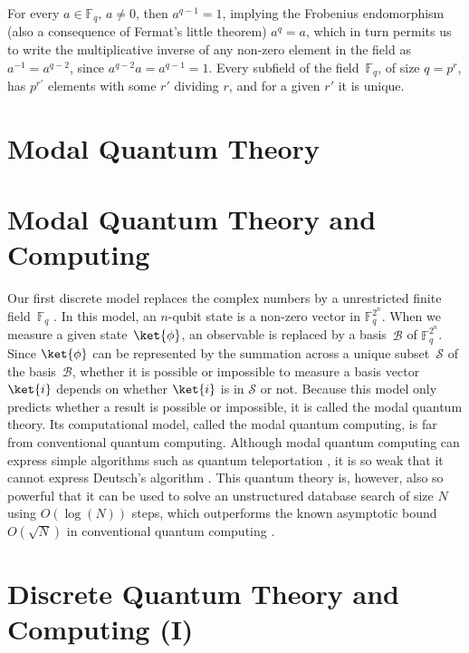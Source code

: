 \documentclass[twoside]{iuphd}
\newcommand{\Fq}{\mathbb{F}_{q}}
\begin{document}
For every $a\in\Fq$, $a\neq0$, then $a^{q-1}=1$, implying the Frobenius
endomorphism (also a consequence of Fermat's little theorem) $a^{q}=a$,
which in turn permits us to write the multiplicative inverse of any
non-zero element in the field as $a^{-1}=a^{q-2}$, since $a^{q-2}a=a^{q-1}=1$.
Every subfield of the field~$\Fq$, of size $q=p^{r}$, has $p^{r'}$
elements with some $r'$ dividing $r$, and for a given $r'$ it is
unique.

\section{Modal Quantum Theory\label{modalquantum}}

\section{Modal Quantum Theory and Computing}

Our first discrete model replaces the complex numbers by a unrestricted
finite field~$\mathbb{F}_{q}$ \cite{Schumacher2012-SCHMQT,DQT2014,SchumacherWestmoreland2010}.
In this model, an $n$-qubit state is a non-zero vector in $\mathbb{F}_{q}^{2^{n}}$.
When we measure a given state~$\ket{\phi}$, an observable is replaced
by a basis~$\mathcal{B}$ of $\mathbb{F}_{q}^{2^{n}}$. Since $\ket{\phi}$
can be represented by the summation across a unique subset~$\mathcal{S}$
of the basis~$\mathcal{B}$, whether it is possible or impossible
to measure a basis vector~$\ket{i}$ depends on whether $\ket{i}$
is in $\mathcal{S}$ or not. Because this model only predicts whether
a result is possible or impossible, it is called the modal quantum
theory. Its computational model, called the modal quantum computing,
is far from conventional quantum computing. Although modal quantum
computing can express simple algorithms such as quantum teleportation
\cite{BennettBrassardEtAl1993,peres1995quantum,Mermin2007,Jaeger2007},
it is so weak that it cannot express Deutsch's algorithm \cite{Deutsch1985,Mermin2007}.
This quantum theory is, however, also so powerful that it can be used
to solve an unstructured database search of size $N$ using $O(\log(N))$
steps, which outperforms the known asymptotic bound $O(\sqrt{N})$
in conventional quantum computing \cite{Grover:1996:FQM:237814.237866,BennettBernsteinBrassardVazirani1997,Mermin2007,Jaeger2007}.

\section{Discrete Quantum Theory and Computing (I)}
\end{document}

